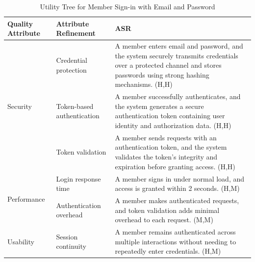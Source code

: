 \documentclass{article}
\begin{document}
\begin{table}[H]
    \centering
    \caption{Utility Tree for Member Sign-in with Email and Password}
    \begin{tabular}{|p{3cm}|p{4cm}|p{7cm}|}
        \hline
        \textbf{Quality Attribute} & \textbf{Attribute Refinement}                                                                                                                                          & \textbf{ASR} \\
        \hline

        \multirow{3}{*}{Security}
                                   & Credential protection
                                   & A member enters email and password, and the system securely transmits credentials over a protected channel and stores passwords using strong hashing mechanisms. (H,H)                \\
        \cline{2-3}
                                   & Token-based authentication
                                   & A member successfully authenticates, and the system generates a secure authentication token containing user identity and authorization data. (H,H)                                    \\
        \cline{2-3}
                                   & Token validation
                                   & A member sends requests with an authentication token, and the system validates the token’s integrity and expiration before granting access. (H,H)                                     \\
        \hline

        \multirow{2}{*}{Performance}
                                   & Login response time
                                   & A member signs in under normal load, and access is granted within 2 seconds. (H,M)                                                                                                    \\
        \cline{2-3}
                                   & Authentication overhead
                                   & A member makes authenticated requests, and token validation adds minimal overhead to each request. (M,M)                                                                              \\
        \hline

        Usability
                                   & Session continuity
                                   & A member remains authenticated across multiple interactions without needing to repeatedly enter credentials. (H,M)                                                                    \\
        \hline


\end{tabular}
\end{table}
\end{document}
